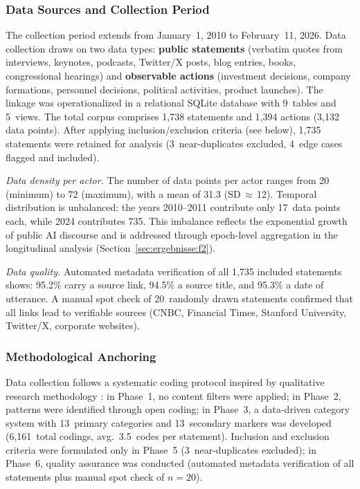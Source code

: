 \documentclass[12pt,a4paper]{article}
\begin{document}
\subsubsection{Data Sources and Collection Period}

The collection period extends from January~1, 2010 to February~11, 2026. Data collection draws on two data types: \textbf{public statements} (verbatim quotes from interviews, keynotes, podcasts, Twitter/X posts, blog entries, books, congressional hearings) and \textbf{observable actions} (investment decisions, company formations, personnel decisions, political activities, product launches). The linkage was operationalized in a relational SQLite database with 9~tables and 5~views. The total corpus comprises 1,738 statements and 1,394 actions (3,132 data points). After applying inclusion/exclusion criteria (see below), 1,735 statements were retained for analysis (3~near-duplicates excluded, 4~edge cases flagged and included).

\emph{Data density per actor.} The number of data points per actor ranges from 20 (minimum) to 72 (maximum), with a mean of 31.3 (SD\,$\approx$\,12). Temporal distribution is unbalanced: the years 2010--2011 contribute only 17~data points each, while 2024 contributes 735. This imbalance reflects the exponential growth of public AI discourse and is addressed through epoch-level aggregation in the longitudinal analysis (Section~\ref{sec:ergebnisse:f2}).

\emph{Data quality.} Automated metadata verification of all 1,735 included statements shows: 95.2\% carry a source link, 94.5\% a source title, and 95.3\% a date of utterance. A manual spot check of 20~randomly drawn statements confirmed that all links lead to verifiable sources (CNBC, Financial Times, Stanford University, Twitter/X, corporate websites).

\subsubsection{Methodological Anchoring}

Data collection follows a systematic coding protocol inspired by qualitative research methodology \citep{StraussCorbin1990}: in Phase~1, no content filters were applied; in Phase~2, patterns were identified through open coding; in Phase~3, a data-driven category system with 13~primary categories and 13~secondary markers was developed (6,161~total codings, avg.\ 3.5~codes per statement). Inclusion and exclusion criteria were formulated only in Phase~5 (3~near-duplicates excluded); in Phase~6, quality assurance was conducted (automated metadata verification of all statements plus manual spot check of $n = 20$).
\end{document}
